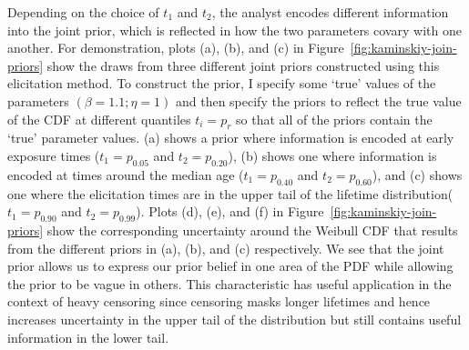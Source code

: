 Depending on the choice of $t_1$ and $t_2$, the analyst encodes different information into the joint prior, which is reflected in how the two parameters covary with one another. For demonstration, plots (a), (b), and (c) in Figure~\ref{fig:kaminskiy-join-priors} show the draws from three different joint priors constructed using this elicitation method. To construct the prior, I specify some `true' values of the parameters $(\beta = 1.1; \eta = 1)$ and then specify the priors to reflect the true value of the CDF at different quantiles $t_i = p_r$ so that all of the priors contain the `true' parameter values. (a) shows a prior where information is encoded at early exposure times ($t_1 = p_{0.05}$ and $t_2 = p_{0.20}$), (b) shows one where information is encoded at times around the median age ($t_1 = p_{0.40}$ and $t_2 = p_{0.60}$), and (c) shows one where the elicitation times are in the upper tail of the lifetime distribution($t_1 = p_{0.90}$ and $t_2 = p_{0.99}$). Plots (d), (e), and (f) in Figure~\ref{fig:kaminskiy-join-priors} show the corresponding uncertainty around the Weibull CDF that results from the different priors in (a), (b), and (c) respectively. We see that the joint prior allows us to express our prior belief in one area of the PDF while allowing the prior to be vague in others. This characteristic has useful application in the context of heavy censoring since censoring masks longer lifetimes and hence increases uncertainty in the upper tail of the distribution but still contains useful information in the lower tail.

